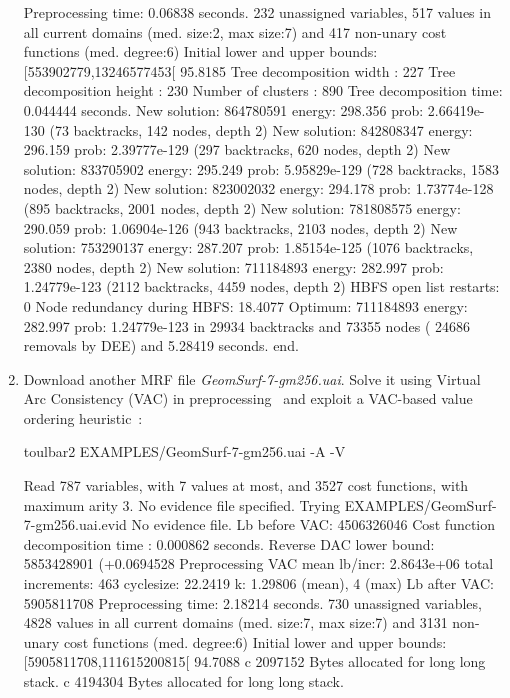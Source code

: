 \begin{enumerate}
{\begin{DoxyCode}
Preprocessing time: 0.06838 seconds.
232 unassigned variables, 517 values in all current domains (med. size:2, max size:7) and 417 non-unary cost functions (med. degree:6)
Initial lower and upper bounds: [553902779,13246577453[ 95.8185%
Tree decomposition width  : 227
Tree decomposition height : 230
Number of clusters        : 890
Tree decomposition time: 0.044444 seconds.
New solution: 864780591 energy: 298.356 prob: 2.66419e-130 (73 backtracks, 142 nodes, depth 2)
New solution: 842808347 energy: 296.159 prob: 2.39777e-129 (297 backtracks, 620 nodes, depth 2)
New solution: 833705902 energy: 295.249 prob: 5.95829e-129 (728 backtracks, 1583 nodes, depth 2)
New solution: 823002032 energy: 294.178 prob: 1.73774e-128 (895 backtracks, 2001 nodes, depth 2)
New solution: 781808575 energy: 290.059 prob: 1.06904e-126 (943 backtracks, 2103 nodes, depth 2)
New solution: 753290137 energy: 287.207 prob: 1.85154e-125 (1076 backtracks, 2380 nodes, depth 2)
New solution: 711184893 energy: 282.997 prob: 1.24779e-123 (2112 backtracks, 4459 nodes, depth 2)
HBFS open list restarts: 0 %
Node redundancy during HBFS: 18.4077 %
Optimum: 711184893 energy: 282.997 prob: 1.24779e-123 in 29934 backtracks and 73355 nodes ( 24686 removals by DEE) and 5.28419 seconds.
end.
\end{DoxyCode}}
\item Download another MRF file {\em GeomSurf-7-gm256.uai}. Solve it using Virtual Arc Consistency (VAC) in preprocessing~\cite{Cooper08} and exploit a VAC-based value ordering heuristic~\cite{Cooper10a}:
\begin{DoxyCode}
	toulbar2 EXAMPLES/GeomSurf-7-gm256.uai -A -V
\end{DoxyCode}
{\scriptsize
\begin{DoxyCode}
Read 787 variables, with 7 values at most, and 3527 cost functions, with maximum arity 3.
No evidence file specified. Trying EXAMPLES/GeomSurf-7-gm256.uai.evid
No evidence file. 
Lb before VAC: 4506326046
Cost function decomposition time : 0.000862 seconds.
Reverse DAC lower bound: 5853428901 (+0.0694528%
Preprocessing VAC mean lb/incr: 2.8643e+06     total increments: 463     cyclesize: 22.2419     k: 1.29806 (mean), 4 (max)
Lb after VAC: 5905811708
Preprocessing time: 2.18214 seconds.
730 unassigned variables, 4828 values in all current domains (med. size:7, max size:7) and 3131 non-unary cost functions (med. degree:6)
Initial lower and upper bounds: [5905811708,111615200815[ 94.7088%
c 2097152 Bytes allocated for long long stack.
c 4194304 Bytes allocated for long long stack.

\end{DoxyCode}}
\end{enumerate}

